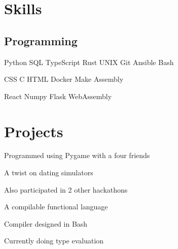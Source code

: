 \documentclass[]{plushcv}
\begin{document}
\begin{minipage}[t]{0.25\textwidth} 


\section{Skills}
\subsection{Programming}
\sectionsep

Python \textbullet{} SQL \textbullet{} TypeScript \textbullet{} Rust \textbullet{} UNIX \textbullet{} Git  \textbullet{} Ansible \textbullet{} Bash \\
\sectionsep

CSS \textbullet{} C \textbullet{} HTML \textbullet{} Docker \textbullet{} Make \textbullet{} Assembly \\
\sectionsep

React \textbullet{} Numpy \textbullet{} Flask \textbullet{} WebAssembly

\sectionsep
\sectionsep


\section{Projects} 

\vspace{\topsep} %
\begin{tightemize}
\item Programmed using Pygame with a four friends
\item A twist on dating simulators
\item Also participated in 2 other hackathons
\end{tightemize}
\sectionsep

\begin{tightemize}
\item A compilable functional language
\item Compiler designed in Bash
\item Currently doing type evaluation
\end{tightemize}
\sectionsep


\end{minipage}
\end{document}
